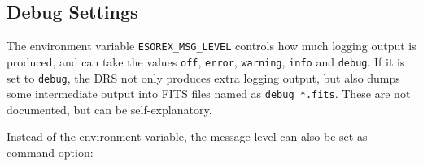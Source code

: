 \subsection{Debug Settings}

The environment variable \texttt{ESOREX\_MSG\_LEVEL} controls how much logging
output is produced, and can take the values \texttt{off}, \texttt{error},
\texttt{warning}, \texttt{info} and \texttt{debug}. If it is set to
\texttt{debug}, the DRS not only produces extra logging output, but also dumps
some intermediate output into FITS files named as \texttt{debug\_*.fits}. These
are not documented, but can be self-explanatory.

Instead of the environment variable, the message level can also be set as
command option:
\begin{shell}
\end{shell}